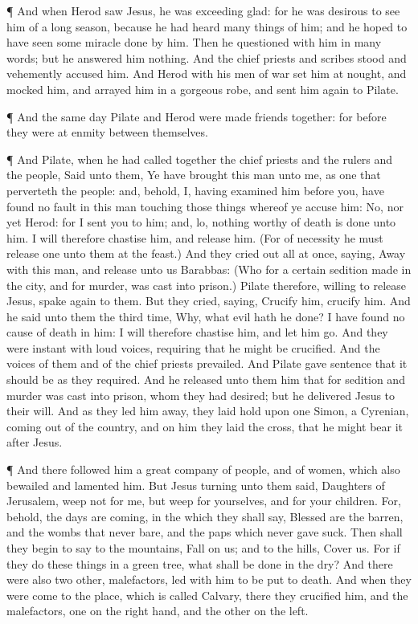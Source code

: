  ¶ And when Herod saw Jesus, he was exceeding glad: for he
was desirous to see him of a long season, because he had heard many
things of him; and he hoped to have seen some miracle done by him.
 Then he questioned with him in many words; but he answered
him nothing.  And the chief priests and scribes stood and
vehemently accused him.  And Herod with his men of war set
him at nought, and mocked him, and arrayed him in a gorgeous robe, and
sent him again to Pilate.

 ¶ And the same day Pilate and Herod were made friends
together: for before they were at enmity between themselves.

 ¶ And Pilate, when he had called together the chief
priests and the rulers and the people,  Said unto them, Ye
have brought this man unto me, as one that perverteth the people: and,
behold, I, having examined him before you, have found no fault in this
man touching those things whereof ye accuse him:  No, nor
yet Herod: for I sent you to him; and, lo, nothing worthy of death is
done unto him.  I will therefore chastise him, and release
him.  (For of necessity he must release one unto them at
the feast.)  And they cried out all at once, saying, Away
with this man, and release unto us Barabbas:  (Who for a
certain sedition made in the city, and for murder, was cast into
prison.)  Pilate therefore, willing to release Jesus, spake
again to them.  But they cried, saying, Crucify him,
crucify him.  And he said unto them the third time, Why,
what evil hath he done? I have found no cause of death in him: I will
therefore chastise him, and let him go.  And they were
instant with loud voices, requiring that he might be crucified. And the
voices of them and of the chief priests prevailed.  And
Pilate gave sentence that it should be as they required. 
And he released unto them him that for sedition and murder was cast into
prison, whom they had desired; but he delivered Jesus to their will.
 And as they led him away, they laid hold upon one Simon, a
Cyrenian, coming out of the country, and on him they laid the cross,
that he might bear it after Jesus.

 ¶ And there followed him a great company of people, and of
women, which also bewailed and lamented him.  But Jesus
turning unto them said, Daughters of Jerusalem, weep not for me, but
weep for yourselves, and for your children.  For, behold,
the days are coming, in the which they shall say, Blessed are the
barren, and the wombs that never bare, and the paps which never gave
suck.  Then shall they begin to say to the mountains, Fall
on us; and to the hills, Cover us.  For if they do these
things in a green tree, what shall be done in the dry?  And
there were also two other, malefactors, led with him to be put to death.
 And when they were come to the place, which is called
Calvary, there they crucified him, and the malefactors, one on the right
hand, and the other on the left.

